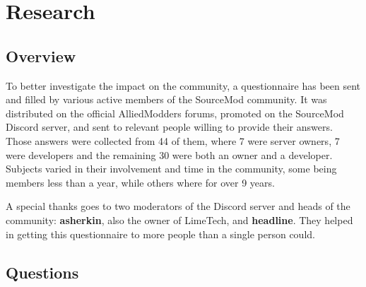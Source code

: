 \chapter{Research}

\section{Overview}

To better investigate the impact on the community, a questionnaire has been sent and filled by various active members of the SourceMod community.
It was distributed on the official AlliedModders forums, promoted on the SourceMod Discord server, and sent to relevant people willing to provide their answers.
Those answers were collected from 44 of them, where 7 were server owners, 7 were developers and the remaining 30 were both an owner and a developer.
Subjects varied in their involvement and time in the community, some being members less than a year, while others where for over 9 years.

A special thanks goes to two moderators of the Discord server and heads of the community: \textbf{asherkin}, also the owner of LimeTech, and \textbf{headline}.
They helped in getting this questionnaire to more people than a single person could.

\section{Questions}

